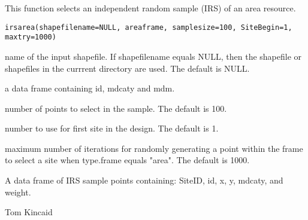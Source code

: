 \begin{Description}\relax
This function selects an independent random sample (IRS) of an area resource.
\end{Description}
\begin{Usage}
\begin{verbatim}
irsarea(shapefilename=NULL, areaframe, samplesize=100, SiteBegin=1, maxtry=1000)
\end{verbatim}
\end{Usage}
\begin{Arguments}
\begin{ldescription}
\item[\code{shapefilename}] name of the input shapefile.  If shapefilename equals
NULL, then the shapefile or shapefiles in the currrent directory are used.
The default is NULL.
\item[\code{areaframe}] a data frame containing id, mdcaty and mdm.
\item[\code{samplesize}] number of points to select in the sample.  The default is
100.
\item[\code{SiteBegin}] number to use for first site in the design.  The default is
1.
\item[\code{maxtry}] maximum number of iterations for randomly generating a point
within the frame to select a site when type.frame equals "area".  The
default is 1000.
\end{ldescription}
\end{Arguments}
\begin{Value}
A data frame of IRS sample points containing: SiteID, id, x, y, mdcaty,
and weight.
\end{Value}
\begin{Author}\relax
Tom Kincaid 
\end{Author}
\begin{SeeAlso}\relax
{}
\end{SeeAlso}

